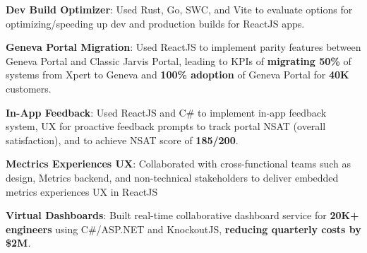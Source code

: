 \documentclass[letterpaper,11pt]{article}
\newcommand{\resumeItem}[2]{
  \item\small{
    \textbf{#1}{: #2 \vspace{-2pt}}
  }
}
\begin{document}
        


        \resumeItem{Dev Build Optimizer}{Used Rust, Go, SWC, and Vite to evaluate options for optimizing/speeding up dev  and production builds for ReactJS apps.
        }


        \resumeItem{Geneva Portal Migration}{Used ReactJS to implement parity features  between Geneva Portal and Classic Jarvis Portal, leading to KPIs of \textbf{migrating 50\%} of systems from Xpert to Geneva and \textbf{100\% adoption} of Geneva Portal for \textbf{40K} customers.    
        }
        
       \resumeItem{In-App Feedback}{Used ReactJS and C\# to implement in-app feedback system, UX for proactive feedback prompts to track portal NSAT (overall satisfaction), and to achieve NSAT score of \textbf{185/200}.
        }

       \resumeItem{Mectrics Experiences UX}{Collaborated with cross-functional teams such as design, Metrics backend, and non-technical stakeholders to deliver embedded metrics experiences UX in ReactJS
       }

       \resumeItem{Virtual Dashboards}{Built real-time collaborative dashboard service for \textbf{20K+ engineers} using C\#/ASP.NET and KnockoutJS, \textbf{reducing quarterly costs by \$2M}.} 

\end{document}
